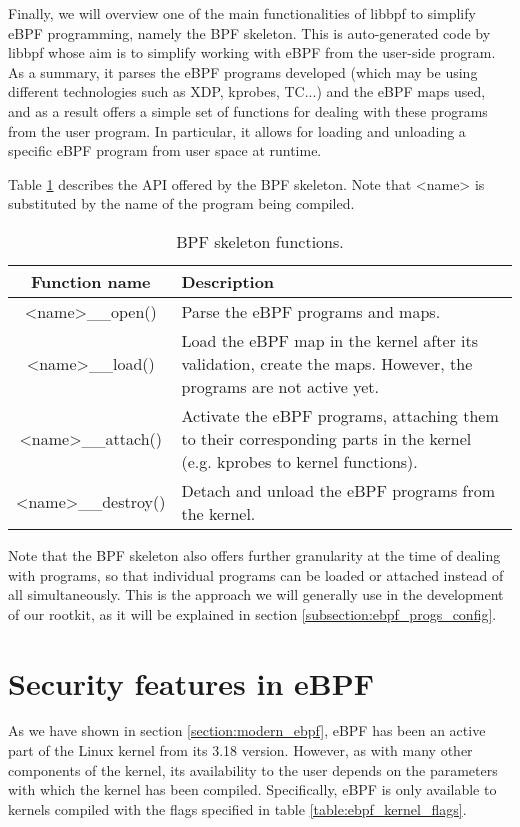 Finally, we will overview one of the main functionalities of libbpf to simplify eBPF programming, namely the BPF skeleton. This is auto-generated code by libbpf whose aim is to simplify working with eBPF from the user-side program. As a summary, it parses the eBPF programs developed (which may be using different technologies such as XDP, kprobes, TC...) and the eBPF maps used, and as a result offers a simple set of functions for dealing with these programs from the user program. In particular, it allows for loading and unloading a specific eBPF program from user space at runtime.

Table \ref{table:libbpf_skel} describes the API offered by the BPF skeleton. Note that <name> is substituted by the name of the program being compiled.

\begin{table}[htbp]
\begin{tabular}{|c|>{\centering\arraybackslash}p{10cm}|}
\hline
Function name & Description\\
\hline
\hline
<name>\_\_open() & Parse the eBPF programs and maps.\\
\hline
<name>\_\_load() & Load the eBPF map in the kernel after its validation, create the maps. However, the programs are not active yet.\\
\hline
<name>\_\_attach() & Activate the eBPF programs, attaching them to their corresponding parts in the kernel (e.g. kprobes to kernel functions).\\
\hline
<name>\_\_destroy() & Detach and unload the eBPF programs from the kernel.\\
\hline
\end{tabular}
\caption{BPF skeleton functions.}
\label{table:libbpf_skel}
\end{table}

Note that the BPF skeleton also offers further granularity at the time of dealing with programs, so that individual programs can be loaded or attached instead of all simultaneously. This is the approach we will generally use in the development of our rootkit, as it will be explained in section \ref{subsection:ebpf_progs_config}.



\section{Security features in eBPF}
As we have shown in section \ref{section:modern_ebpf}, eBPF has been an active part of the Linux kernel from its 3.18 version. However, as with many other components of the kernel, its availability to the user depends on the parameters with which the kernel has been compiled. Specifically, eBPF is only available to kernels compiled with the flags specified in table \ref{table:ebpf_kernel_flags}.

